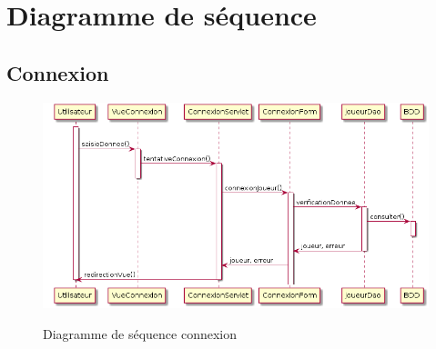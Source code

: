 \section{Diagramme de séquence }

\subsection{Connexion}
\begin{figure}[H]
  \center
  \includegraphics[scale=0.25]{../graph/DiagrammeSequenceConnexion.png} \\
  \caption{Diagramme de séquence connexion}
\end{figure}